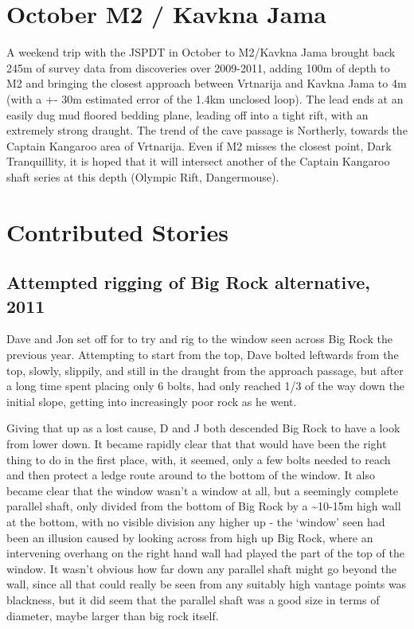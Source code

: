 \hypertarget{october-m2-kavkna-jama}{%
\section{October M2 / Kavkna Jama}\label{october-m2-kavkna-jama}}

A weekend trip with the JSPDT in October to M2/Kavkna Jama brought back
245m of survey data from discoveries over 2009-2011, adding 100m of
depth to M2 and bringing the closest approach between Vrtnarija and
Kavkna Jama to 4m (with a +- 30m estimated error of the 1.4km unclosed
loop). The lead ends at an easily dug mud floored bedding plane, leading
off into a tight rift, with an extremely strong draught. The trend of
the cave passage is Northerly, towards the Captain Kangaroo area of
Vrtnarija. Even if M2 misses the closest point, Dark Tranquillity, it is
hoped that it will intersect another of the Captain Kangaroo shaft
series at this depth (Olympic Rift, Dangermouse).

\hypertarget{contributed-stories}{%
\section{Contributed Stories}\label{contributed-stories}}

\hypertarget{attempted-rigging-of-big-rock-alternative-2011}{%
\subsection{Attempted rigging of Big Rock alternative,
2011}\label{attempted-rigging-of-big-rock-alternative-2011}}

Dave and Jon set off for to try and rig to the window seen across Big
Rock the previous year. Attempting to start from the top, Dave bolted
leftwards from the top, slowly, slippily, and still in the draught from
the approach passage, but after a long time spent placing only 6 bolts,
had only reached 1/3 of the way down the initial slope, getting into
increasingly poor rock as he went.

Giving that up as a lost cause, D and J both descended Big Rock to have
a look from lower down. It became rapidly clear that that would have
been the right thing to do in the first place, with, it seemed, only a
few bolts needed to reach and then protect a ledge route around to the
bottom of the window. It also became clear that the window wasn't a
window at all, but a seemingly complete parallel shaft, only divided
from the bottom of Big Rock by a \textasciitilde{}10-15m high wall at
the bottom, with no visible division any higher up - the `window' seen
had been an illusion caused by looking across from high up Big Rock,
where an intervening overhang on the right hand wall had played the part
of the top of the window. It wasn't obvious how far down any parallel
shaft might go beyond the wall, since all that could really be seen from
any suitably high vantage points was blackness, but it did seem that the
parallel shaft was a good size in terms of diameter, maybe larger than
big rock itself.

